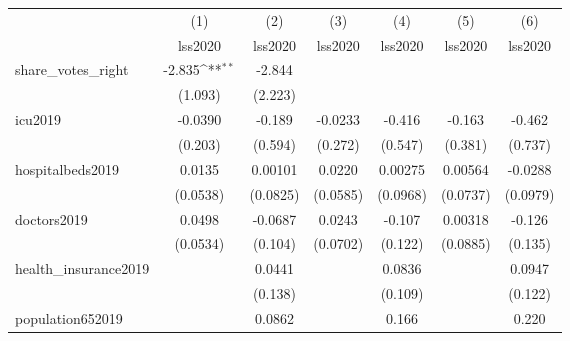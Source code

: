{
\def\sym#1{\ifmmode^{#1}\else\(^{#1}\)\fi}
\begin{tabular}{l*{6}{c}}
\hline\hline
            &\multicolumn{1}{c}{(1)}&\multicolumn{1}{c}{(2)}&\multicolumn{1}{c}{(3)}&\multicolumn{1}{c}{(4)}&\multicolumn{1}{c}{(5)}&\multicolumn{1}{c}{(6)}\\
            &\multicolumn{1}{c}{lss2020}&\multicolumn{1}{c}{lss2020}&\multicolumn{1}{c}{lss2020}&\multicolumn{1}{c}{lss2020}&\multicolumn{1}{c}{lss2020}&\multicolumn{1}{c}{lss2020}\\
\hline
share\_votes\_right&      -2.835\sym{**} &      -2.844         &                     &                     &                     &                     \\
            &     (1.093)         &     (2.223)         &                     &                     &                     &                     \\
[1em]
icu2019     &     -0.0390         &      -0.189         &     -0.0233         &      -0.416         &      -0.163         &      -0.462         \\
            &     (0.203)         &     (0.594)         &     (0.272)         &     (0.547)         &     (0.381)         &     (0.737)         \\
[1em]
hospitalbeds2019&      0.0135         &     0.00101         &      0.0220         &     0.00275         &     0.00564         &     -0.0288         \\
            &    (0.0538)         &    (0.0825)         &    (0.0585)         &    (0.0968)         &    (0.0737)         &    (0.0979)         \\
[1em]
doctors2019 &      0.0498         &     -0.0687         &      0.0243         &      -0.107         &     0.00318         &      -0.126         \\
            &    (0.0534)         &     (0.104)         &    (0.0702)         &     (0.122)         &    (0.0885)         &     (0.135)         \\
[1em]
health\_insurance2019&                     &      0.0441         &                     &      0.0836         &                     &      0.0947         \\
            &                     &     (0.138)         &                     &     (0.109)         &                     &     (0.122)         \\
[1em]
population652019&                     &      0.0862         &                     &       0.166         &                     &       0.220         \\

\end{tabular}}
